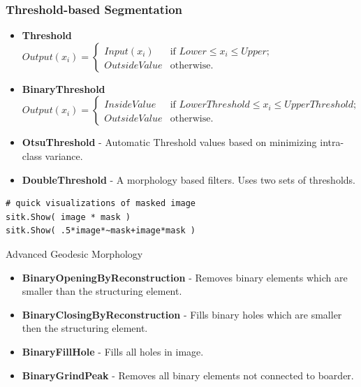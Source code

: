 \begin{frame}[fragile]
\frametitle{Threshold-based Segmentation}

\begin{itemize}
  \item {\bf Threshold}\\
    \small
    $ Output(x_i) =
    \begin{cases} Input(x_i) &\text{if $Lower \leq x_i \leq Upper$;}  \\
      OutsideValue            &\text{otherwise.}
    \end{cases} $
    \normalsize
  \item {\bf BinaryThreshold}\\
    \small
    $ Output(x_i) =
    \begin{cases} InsideValue &\text{if $LowerThreshold \leq x_i \leq UpperThreshold$;}  \\
      OutsideValue            &\text{otherwise.}
    \end{cases} $
    \normalsize
  \item {\bf OtsuThreshold} - Automatic Threshold values based on minimizing intra-class variance.
  \item {\bf DoubleThreshold} - A morphology based filters. Uses two sets of thresholds.
\end{itemize}

\lstpython
\begin{lstlisting}
# quick visualizations of masked image
sitk.Show( image * mask )
sitk.Show( .5*image*~mask+image*mask )
\end{lstlisting}

\end{frame}


\begin{frame}{Advanced Geodesic Morphology}

\begin{itemize}
  \item {\bf BinaryOpeningByReconstruction} - Removes binary elements which are smaller than the structuring element.
  \item {\bf BinaryClosingByReconstruction} - Fills binary holes which are smaller then the structuring element.
  \item {\bf BinaryFillHole} - Fills all holes in image.
  \item {\bf BinaryGrindPeak} - Removes all binary elements not connected to boarder.
\end{itemize}

\end{frame}

